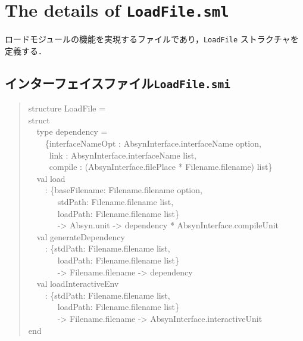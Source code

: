 \documentclass{jbook}
\newif\ifjp
\newcommand{\txt}[2]{#2}
\newcommand{\code}[1]{\mbox{\large\tt #1}}
\newcommand{\myem}{\mbox{\ \ }}
\newenvironment{program}{\begin{quote}\begin{tt}}%
                        {\end{tt}\end{quote}}
\begin{document}
\section{\txt{\code{LoadFile.sml}の処理の詳細}{The details of \code{LoadFile.sml}}}
\ifjp%

	ロードモジュールの機能を実現するファイルであり，\code{LoadFile}
ストラクチャを定義する．

\subsection{インターフェイスファイル\code{LoadFile.smi}}
\begin{program}
structure LoadFile =\\
struct\\
\myem  type dependency =\\
\myem\myem      \{interfaceNameOpt : AbsynInterface.interfaceName option,\\
\myem\myem\      link : AbsynInterface.interfaceName list,\\
\myem\myem\      compile : (AbsynInterface.filePlace * Filename.filename) list\}\\
\myem  val load\\
\myem\myem      : \{baseFilename: Filename.filename option,\\
\myem\myem\myem\         stdPath: Filename.filename list,\\
\myem\myem\myem\         loadPath: Filename.filename list\}\\
\myem\myem\myem\       -> Absyn.unit -> dependency * AbsynInterface.compileUnit\\
\myem  val generateDependency\\
\myem\myem      : \{stdPath: Filename.filename list,\\
\myem\myem\myem\         loadPath: Filename.filename list\}\\
\myem\myem\myem\        -> Filename.filename -> dependency\\
\myem  val loadInteractiveEnv\\
\myem\myem      : \{stdPath: Filename.filename list,\\
\myem\myem\myem\        loadPath: Filename.filename list\}\\
\myem\myem\myem\        -> Filename.filename -> AbsynInterface.interactiveUnit\\
end
\end{program}
\end{document}
